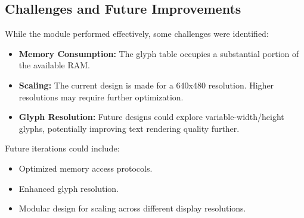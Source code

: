 \documentclass{subfile}
\begin{document}
  \subsection{Challenges and Future Improvements}
  While the module performed effectively, some challenges were identified:
  \begin{itemize}
      \item \textbf{Memory Consumption:} The glyph table occupies a substantial portion of the available RAM. 
      \item \textbf{Scaling:} The current design is made for a 640x480 resolution. Higher resolutions may require further optimization.
      \item \textbf{Glyph Resolution:} Future designs could explore variable-width/height glyphs, potentially improving text rendering quality further.
  \end{itemize}

  Future iterations could include:
  \begin{itemize}
      \item Optimized memory access protocols.
      \item Enhanced glyph resolution.
      \item Modular design for scaling across different display resolutions.
  \end{itemize}

\end{document}
